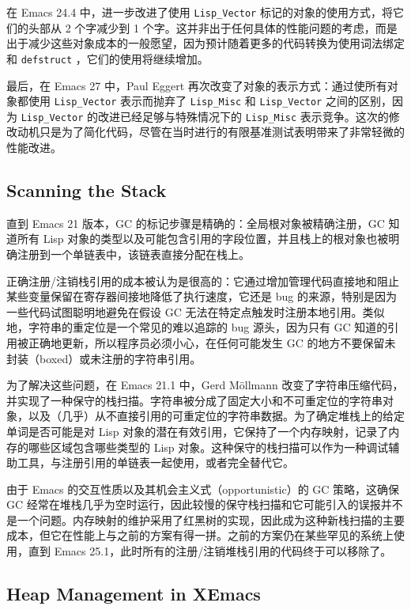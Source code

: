 \documentclass[format=acmsmall,screen]{acmart}
\begin{document}
在 Emacs 24.4 中，进一步改进了使用 \texttt{Lisp\_Vector} 标记的对象的使用方式，将它们的头部从 2 个字减少到 1 个字。这并非出于任何具体的性能问题的考虑，而是出于减少这些对象成本的一般愿望，因为预计随着更多的代码转换为使用词法绑定和 \texttt{defstruct} ，它们的使用将继续增加。

最后，在 Emacs 27 中，Paul Eggert 再次改变了对象的表示方式：通过使所有对象都使用 \texttt{Lisp\_Vector} 表示而抛弃了 \texttt{Lisp\_Misc} 和 \texttt{Lisp\_Vector} 之间的区别，因为 \texttt{Lisp\_Vector} 的改进已经足够与特殊情况下的 \texttt{Lisp\_Misc} 表示竞争。这次的修改动机只是为了简化代码，尽管在当时进行的有限基准测试表明带来了非常轻微的性能改进。

\subsection{Scanning the Stack}
\label{sec:stack-scanning}

直到 Emacs 21 版本，GC 的标记步骤是精确的：全局根对象被精确注册，GC 知道所有 Lisp 对象的类型以及可能包含引用的字段位置，并且栈上的根对象也被明确注册到一个单链表中，该链表直接分配在栈上。

正确注册/注销栈引用的成本被认为是很高的：它通过增加管理代码直接地和阻止某些变量保留在寄存器间接地降低了执行速度，它还是 bug 的来源，特别是因为一些代码试图聪明地避免在假设 GC 无法在特定点触发时注册本地引用。类似地，字符串的重定位是一个常见的难以追踪的 bug 源头，因为只有 GC 知道的引用被正确地更新，所以程序员必须小心，在任何可能发生 GC 的地方不要保留未封装（boxed）或未注册的字符串引用。

为了解决这些问题，在 Emacs 21.1 中，Gerd Möllmann 改变了字符串压缩代码，并实现了一种保守的栈扫描。字符串被分成了固定大小和不可重定位的字符串对象，以及（几乎）从不直接引用的可重定位的字符串数据。为了确定堆栈上的给定单词是否可能是对 Lisp 对象的潜在有效引用，它保持了一个内存映射，记录了内存的哪些区域包含哪些类型的 Lisp 对象。这种保守的栈扫描可以作为一种调试辅助工具，与注册引用的单链表一起使用，或者完全替代它。

由于 Emacs 的交互性质以及其机会主义式（opportunistic）的 GC 策略，这确保 GC 经常在堆栈几乎为空时运行，因此较慢的保守栈扫描和它可能引入的误报并不是一个问题。内存映射的维护采用了红黑树的实现，因此成为这种新栈扫描的主要成本，但它在性能上与之前的方案有得一拼。之前的方案仍在某些罕见的系统上使用，直到 Emacs 25.1，此时所有的注册/注销堆栈引用的代码终于可以移除了。

\subsection{Heap Management in XEmacs}
\label{sec:heap-xemacs}
\end{document}
